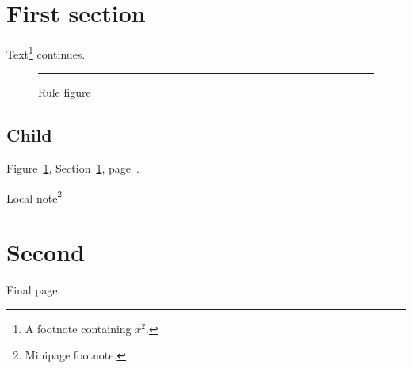 \documentclass{article}
\begin{document}
\tableofcontents\listoffigures
\section{First section}\label{sec:first}Text\footnote{A footnote containing $x^2$.} continues.
\begin{figure}[tbp]\centering\rule{100pt}{40pt}\caption{Rule figure}\label{fig:rule}\end{figure}
\subsection{Child}Figure~\ref{fig:rule}, Section~\ref{sec:first}, page~\pageref{fig:rule}.
\begin{minipage}{200pt}Local note\footnote{Minipage footnote.}\end{minipage}
\clearpage\section{Second}Final page.
\end{document}

